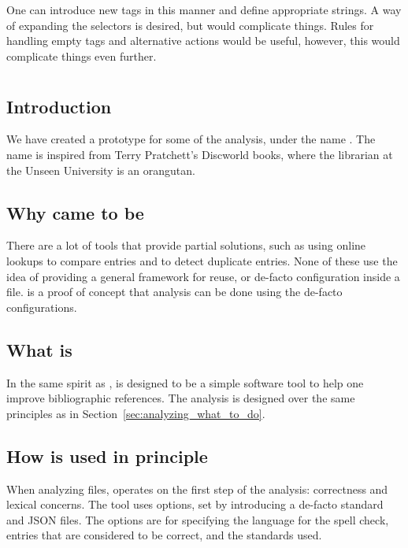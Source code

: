 One can introduce new tags in this manner and define appropriate
strings.  A way of expanding the selectors is desired, but would
complicate things.  Rules for handling empty tags and alternative
actions would be useful, however, this would complicate things even
further.


\section{{\orangutan}}
\label{sec:analyzing_orangutan}
\subsection{Introduction}

We have created a prototype for some of the analysis, under the name
\newdef{\orangutan}.  The name {\orangutan} is inspired from Terry
Pratchett's Discworld books, where the librarian at the Unseen
University is an orangutan.


\subsection{Why {\orangutan} came to be}

There are a lot of tools that provide partial solutions, such as using
online lookups to compare entries and to detect duplicate entries.
None of these use the idea of providing a general framework for reuse,
or de-facto configuration inside a {\bibtex} file.  {\orangutan} is a
proof of concept that analysis can be done using the de-facto
configurations.



\subsection{What is {\orangutan}}

In the same spirit as {\bibtex}, {\orangutan} is designed to be a
simple software tool to help one improve bibliographic references.
The analysis is designed over the same principles as in
Section~\ref{sec:analyzing_what_to_do}.


\subsection{How {\orangutan} is used in principle}

When analyzing {\bibtex} files, {\orangutan} operates on the first
step of the analysis: correctness and lexical concerns.  The tool uses
options, set by introducing a de-facto standard and JSON files.  The
options are for specifying the language for the spell check, entries
that are considered to be correct, and the standards used.


